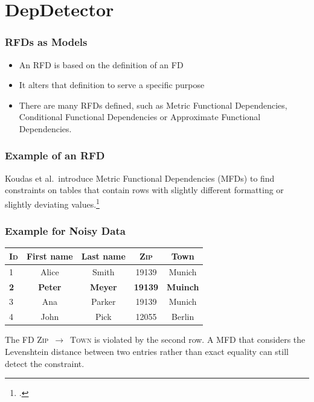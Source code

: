 \documentclass{beamer}
\begin{document}
\section{DepDetector}
\begin{frame}
    \frametitle{RFDs as Models}
    \begin{itemize}
        \item An RFD is based on the definition of an FD
        \item It alters that definition to serve a specific purpose
        \item There are many RFDs defined, such as Metric Functional Dependencies, Conditional Functional Dependencies or Approximate Functional Dependencies.
    \end{itemize}
\end{frame}

\begin{frame}
    \frametitle{Example of an RFD}
    \begin{Example}
        Koudas et al.\ introduce Metric Functional Dependencies (MFDs) to find constraints on tables that contain rows with slightly different formatting or slightly deviating values.\footcite{KOU09}
    \end{Example}
\end{frame}

\begin{frame}
    \frametitle{Example for Noisy Data}
    \begin{table}[ht]
        \centering
        \begin{tabular}{lcccc}
            \toprule
            \toprule
            \textsc{Id} & First name & Last name & \textsc{Zip} & Town \\
            \midrule
            1 & Alice & Smith & 19139 & Munich \\
            \textbf{2} & \textbf{Peter}& \textbf{Meyer} & \textbf{19139} & \textbf{Muinch} \\
            3 & Ana & Parker & 19139 & Munich \\
            4 & John & Pick & 12055 & Berlin \\
            \bottomrule
            \bottomrule
        \end{tabular}
    \end{table}
The FD \textsc{Zip}~$\rightarrow$~\textsc{Town} is violated by the second row. A MFD that considers the Levenshtein distance between two entries rather than exact equality can still detect the constraint.
\end{frame}
\end{document}
